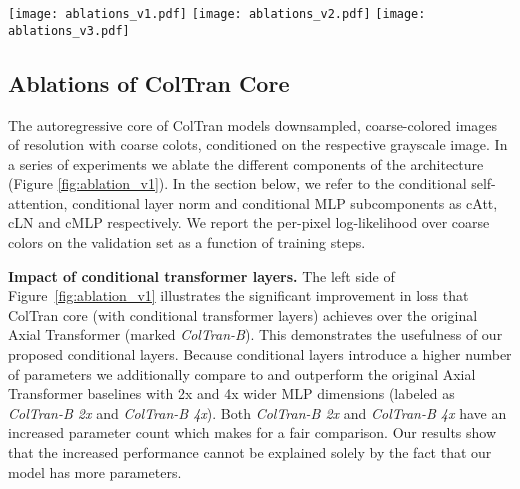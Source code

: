 \documentclass{article} \usepackage{iclr2021_conference,times}
\begin{document}
\begin{figure*}
\centering
\texttt{[image: ablations\_v1.pdf]} \hfill
\texttt{[image: ablations\_v2.pdf]} \hfill
\texttt{[image: ablations\_v3.pdf]}

\caption{Per pixel log-likelihood of coarse colored  images over the validation set as a function of training steps. We ablate the various components of the ColTran core in each plot. \textbf{Left:} \textit{ColTran} with Conditional Transformer Layers vs a baseline Axial Transformer which conditions via addition (\textit{ColTran-B}). \textit{ColTran-B 2x} and \textit{ColTran-B 4x} refer to wider baselines with increased model capacity. \textbf{Center:} Removing each conditional sub-component one at a time (\textit{no cLN}, \textit{no cMLP} and \textit{no cAtt}). \textbf{Right:} Conditional shifts only (\textit{Shift}), Conditional scales only (\textit{Scale}), removal of kq conditioning in cAtt (\textit{cAtt, only v}) and fixed mean pooling in cLN (\textit{cLN, mean pool}). See Section \ref{ablations} for more details.}
\label{fig:ablation_v1}
\end{figure*}

\subsection{Ablations of ColTran Core}
\label{ablations}

The autoregressive core of ColTran models downsampled, coarse-colored images of resolution  with  coarse colots, conditioned on the respective grayscale image. In a series of experiments we ablate the different components of the architecture (Figure \ref{fig:ablation_v1}). In the section below, we refer to the conditional self-attention, conditional layer norm and conditional MLP subcomponents as cAtt, cLN and cMLP respectively. We report the per-pixel log-likelihood over  coarse colors on the validation set as a function of training steps.


\textbf{Impact of conditional transformer layers.} The left side of Figure~\ref{fig:ablation_v1} illustrates the significant  improvement in loss that ColTran core (with conditional transformer layers) achieves over the original Axial Transformer (marked \textit{ColTran-B}). This demonstrates the usefulness of our proposed conditional layers. Because conditional layers introduce a higher number of parameters we additionally compare to and outperform the original Axial Transformer baselines with 2x and 4x wider MLP dimensions (labeled as \textit{ColTran-B 2x} and \textit{ColTran-B 4x}). Both \textit{ColTran-B 2x} and \textit{ColTran-B 4x} have an increased parameter count which makes for a fair comparison. Our results show that the increased performance cannot be explained solely by the fact that our model has more parameters.
\end{document}
